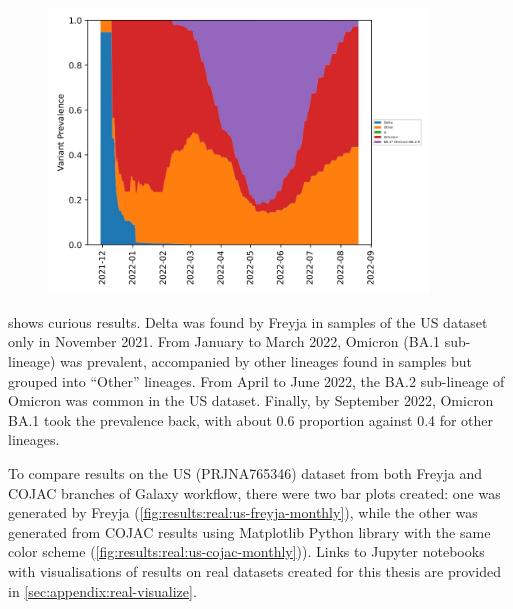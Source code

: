     \begin{figure}[ht!]
        \centering
        \includegraphics[width=0.9\textwidth]{figures/results/real/us-freyja-daily.jpg}
        \label{fig:results:real:us-freyja-daily}
    \end{figure}
    
     shows curious results. Delta was found by Freyja in samples of the US dataset only in November 2021. From January to March 2022, Omicron (BA.1 sub-lineage) was prevalent, accompanied by other lineages found in samples but grouped into “Other” lineages. From April to June 2022, the BA.2 sub-lineage of Omicron was common in the US dataset. Finally, by September 2022, Omicron BA.1 took the prevalence back, with about 0.6 proportion against 0.4 for other lineages.

    To compare results on the US (PRJNA765346) dataset from both Freyja and COJAC branches of Galaxy workflow, there were two bar plots created: one was generated by Freyja  (\cref{fig:results:real:us-freyja-monthly}), while the other was generated from COJAC results using Matplotlib Python library with the same color scheme (\cref{fig:results:real:us-cojac-monthly})). Links to Jupyter notebooks with visualisations of results on real datasets created for this thesis are provided in \cref{sec:appendix:real-visualize}.
    
